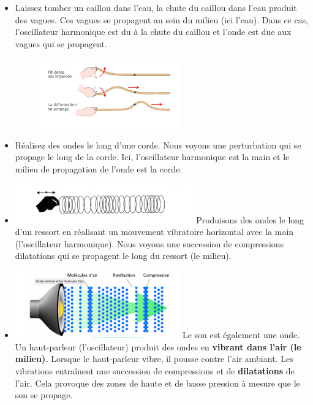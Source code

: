 \begin{itemize}
\item  Laissez tomber un caillou dans l'eau, la chute du caillou dans l'eau
  produit des vagues. Ces vagues se propagent au sein du milieu (ici
  l'eau). Dans ce cas, l'oscillateur harmonique est du à la chute du
  caillou et l'onde est due aux vagues qui se propagent.
   \begin{figure}
   \centering
   \includegraphics[width=6.01cm,height=2.988cm]{Pictures/1000000100000154000000A9940E61F701C2806C.png}
   \caption{}
   \end{figure}
\item   Réalisez des ondes le long d'une corde. Nous voyons une perturbation
  qui se propage le long de la corde. Ici, l'oscillateur harmonique est
  la main et le milieu de propagation de l'onde est la corde.
\item
  \includegraphics[width=7.691cm,height=1.693cm]{Pictures/10000001000001980000005A57BF3FA5614CAA87.png}
  Produisons
  des ondes le long d'un ressort en réalisant un mouvement vibratoire
  horizontal avec la main (l'oscillateur harmonique). Nous voyons une
  succession de compressions dilatations qui se propagent le long du
  ressort (le milieu).
\item  \includegraphics[width=7.103cm,height=2.916cm]{Pictures/100000010000029C00000112A3C2AC0127D5FB85.png}
Le   son est également une onde. Un haut-parleur (l'oscillateur) produit
  des ondes en \textbf{\textbf{vibrant dans l'air (le milieu)}.} Lorsque
  le haut-parleur vibre, il pousse contre l'air ambiant. Les vibrations
  entraînent une succession de compressions et de
  \textbf{\textbf{dilatations} }de l'air. Cela provoque des zones de
  haute et de basse pression à mesure que le son se propage.
\end{itemize}

